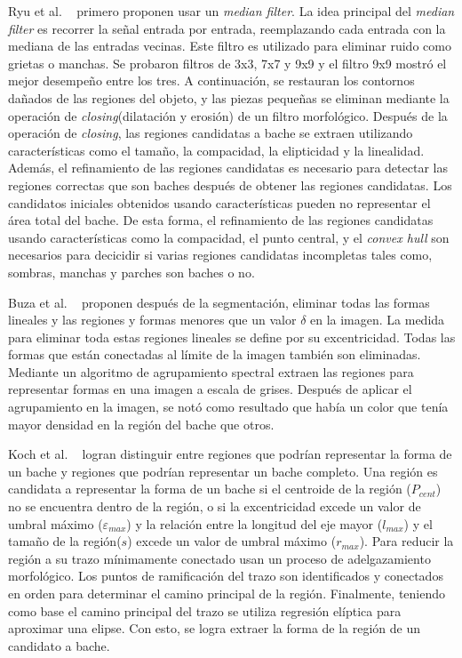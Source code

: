 Ryu et al. ~ primero proponen usar un \emph{median filter}. La idea principal del \emph{median filter} es recorrer la señal 
entrada por entrada, reemplazando cada entrada con la mediana de las entradas vecinas. Este filtro es utilizado para eliminar ruido como grietas o manchas. 
Se probaron filtros de 3x3, 7x7 y 9x9 y el filtro 9x9 mostró el mejor desempeño entre los tres. A continuación, se restauran los contornos dañados de las 
regiones del objeto, y las piezas pequeñas se eliminan mediante la operación de \emph{closing}(dilatación y erosión) de un filtro morfológico. Después de la operación 
de \emph{closing}, las regiones candidatas a bache se extraen utilizando características como el tamaño, la compacidad, la elipticidad
y la linealidad. Además, el refinamiento de las regiones candidatas es necesario para detectar las regiones correctas que son baches después de obtener las regiones 
candidatas. Los candidatos iniciales obtenidos usando características pueden no representar el área total del bache. De esta forma, el refinamiento de las 
regiones candidatas usando características como la compacidad, el punto central, y el \emph{convex hull} son necesarios para decicidir 
si varias regiones candidatas incompletas tales como, sombras, manchas y parches son baches o no.

Buza et al. ~ proponen después de la segmentación, eliminar todas las formas lineales  y las regiones y formas 
menores que un valor $\delta$ en la imagen. La medida para eliminar toda estas regiones lineales se define por su excentricidad. Todas 
las formas que están conectadas al límite de la imagen también son eliminadas. Mediante un algoritmo de agrupamiento spectral extraen 
las regiones para representar formas en una imagen a escala de grises. Después de aplicar  el agrupamiento en la imagen,  
se notó como resultado que había un color que tenía mayor densidad en la región del bache que otros.

Koch et al. ~ logran distinguir entre regiones que podrían representar la forma de un bache y 
regiones que podrían representar un bache completo. Una región es candidata a representar la forma de un bache si 
el centroide de la región ($P_{cent}$) no se encuentra dentro de la región, o si la excentricidad excede un valor de umbral 
máximo ($\varepsilon_{max}$) y la relación entre la longitud del eje mayor ($l_{max}$) y el tamaño de la región($s$) excede
un valor de umbral máximo ($r_{max}$). Para reducir la región a su trazo  mínimamente conectado usan un proceso
de adelgazamiento morfológico. Los puntos de ramificación del trazo son identificados y conectados en orden para 
determinar el camino principal de la región. Finalmente, teniendo como base el camino principal del trazo 
se utiliza regresión elíptica para aproximar una elipse. Con esto, se logra extraer la forma de la región de un 
candidato a bache.

